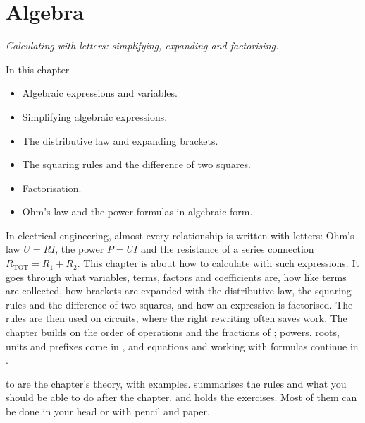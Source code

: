 
\chapter{Algebra}
\label{c2:ch}

{\large\itshape Calculating with letters: simplifying, expanding and factorising.\par}

\begin{chapterbox}{In this chapter}
\begin{itemize}
  \item Algebraic expressions and variables.
  \item Simplifying algebraic expressions.
  \item The distributive law and expanding brackets.
  \item The squaring rules and the difference of two squares.
  \item Factorisation.
  \item Ohm's law and the power formulas in algebraic form.
\end{itemize}
\end{chapterbox}

In electrical engineering, almost every relationship is written with letters: Ohm's law $U = RI$,
the power $P = UI$ and the resistance of a series connection $R_{\text{TOT}} = R_1 + R_2$. This
chapter is about how to calculate with such expressions. It goes through what variables, terms,
factors and coefficients are, how like terms are collected, how brackets are expanded with the
distributive law, the squaring rules and the difference of two squares, and how an expression is
factorised. The rules are then used on circuits, where the right rewriting often saves work. The
chapter builds on the order of operations and the fractions of ; powers, roots, units and
prefixes come in , and equations and working with formulas continue in .

 to  are the chapter's theory, with examples.
 summarises the rules and what you should be able to do after the
chapter, and  holds the exercises. Most of them can be done in your head
or with pencil and paper.




